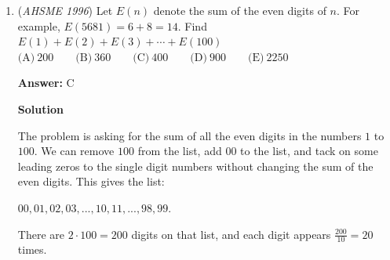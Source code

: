 \begin{enumerate}
 In option $A$, when $m$ gets large, the distance gets large.  Thus, $A$ is not a valid answer.

 In option $C$, when $m$ gets large, the distance approaches $0$, not $h$ as desired.  This is not a valid answer.  (In fact, this is the distance Sunny runs, which does approach $0$ as Moonbeam gets faster and faster.)

 In option $D$, when $m$ gets large, the ratio $\frac{m}{m-1}$ gets very close to, but remains just a tiny bit over, the number $1$.  Thus, when you multiply it by $h$, the ratio in option $D$ gets very close to, but remains just a tiny bit over, $h$.  Thus, the best option out of all the choices is $\boxed{D}$.

 



\textbf{Solution 3}

Assume that Sunny originally runs at a unit speed, and thus Moonbeam runs at a rate of $m$.

 Choose a new reference frame where Sunny is still, and Moonbeam runs at a rate of $m-1$.  In this new reference frame, the distance to be run is still $h$.

 Moonbeam runs this distance $h$ in a time of $\frac{h}{m-1}$

 Returning to the original reference frame, if Moonbeam runs for $\frac{h}{m-1}$ seconds, Moonbeam will cover a distance of $\frac{hm}{m-1}$, which is option $\boxed{D}$.

 


	\item (\textit{AHSME 1996}) Let $E(n)$ denote the sum of the even digits of $n$. For example, $E(5681) = 6+8 = 14$.  Find $E(1)+E(2)+E(3)+\cdots+E(100)$
$\text{(A)}\ 200\qquad\text{(B)}\ 360\qquad\text{(C)}\ 400\qquad\text{(D)}\ 900\qquad\text{(E)}\ 2250$

 \textbf{Answer: }C



\textbf{Solution}

The problem is asking for the sum of all the even digits in the numbers $1$ to $100$.  We can remove $100$ from the list, add $00$ to the list, and tack on some leading zeros to the single digit numbers without changing the sum of the even digits.  This gives the list:

 $00, 01, 02, 03, ..., 10, 11, ..., 98, 99$.

 There are $2\cdot 100 = 200$ digits on that list, and each digit appears $\frac{200}{10} = 20$ times.


\end{enumerate}
